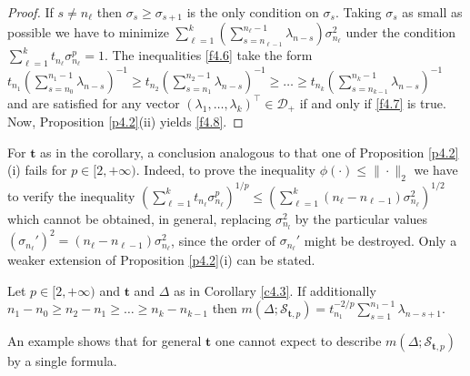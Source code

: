 \documentclass{amsart}
\begin{document}
\begin{proof}
If $s \not= n_\ell$ then $\sigma_s \geq \sigma_{s+1}$ is the only condition on $\sigma_s$. Taking $\sigma_s$ as small as possible we have to minimize $\sum_{\ell=1}^k \left(\sum_{s=n_{\ell-1}}^{n_\ell-1} \lambda_{n-s} \right)\sigma_{n_\ell}^2$ under the condition $\sum_{\ell=1}^k t_{n_\ell}\sigma_{n_\ell}^p =1$. The inequalities \eqref{f4.6} take the form $t_{n_1} \left(\sum_{s=n_0}^{n_1-1} \lambda_{n-s} \right)^{-1} \geq t_{n_2} \left(\sum_{s=n_1}^{n_2-1}  \lambda_{n-s} \right)^{-1}  \geq \ldots \geq t_{n_k} \left(\sum_{s=n_{k-1}}^{n_k-1}  \lambda_{n-s} \right)^{-1} $ and are satisfied for any vector $(\lambda_1,\ldots,\lambda_k)^\top \in {\mathcal D}_+$ if and only if \eqref{f4.7} is true. Now, Proposition \ref{p4.2}(ii) yields \eqref{f4.8}.
\end{proof}

For $\mathbf t$ as in the corollary, a conclusion analogous to that one of Proposition \ref{p4.2}(i) fails for $p \in [2,+\infty)$. Indeed, to prove the inequality $\phi( \cdot ) \leq \| \cdot \|_2$ we have to verify the inequality $\left( \sum_{\ell=1}^k t_{n_\ell} \sigma_{n_\ell}^p \right)^{1/p} \leq \left(\sum_{\ell=1}^k (n_\ell-n_{\ell-1}) \sigma_{n_\ell}^2\right)^{1/2}$ which cannot be obtained, in general, replacing $\sigma_{n_l}^2$ by the particular values $(\sigma_{n_\ell}')^2 =(n_\ell-n_{\ell-1}) \sigma_{n_\ell}^2$, since  the order of $\sigma_{n_\ell}'$ might be destroyed. Only a weaker extension of Proposition \ref{p4.2}(i) can be stated.

\begin{cor}  \label{c4.4}
   Let $p \in [2,+\infty)$ and $\mathbf t$ and $\Delta$ as in Corollary \ref{c4.3}. If additionally $n_1-n_0 \geq n_2-n_1 \geq \ldots \geq n_k-n_{k-1}$    then $m(\Delta ; {\mathcal S}_{{\mathbf t}, p}) = t_{n_1}^{-2/p} \sum_{s=1}^{n_1 - 1} \lambda_{n-s+1}$. 
\end{cor}   

An example shows that for general $\mathbf t$ one cannot expect to describe $m(\Delta ; {\mathcal S}_{{\mathbf t}, p})$ by a single formula.
\end{document}
